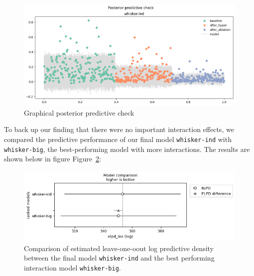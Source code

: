 \documentclass[
  letterpaper,
  DIV=11,
  numbers=noendperiod,
  oneside]{scrartcl}
\theoremstyle{plain}
\theoremstyle{remark}
\begin{document}
\begin{figure}

\begin{minipage}{\linewidth}

\includegraphics{../plots/whisker-posterior-check-ind.png}

\end{minipage}%

\caption{\label{fig-whisker-posterior-check}Graphical posterior
predictive check}

\end{figure}%

To back up our finding that there were no important interaction effects,
we compared the predictive performance of our final model
\texttt{whisker-ind} with \texttt{whisker-big}, the best-performing
model with more interactions. The results are shown below in figure
Figure~\ref{fig-whisker-loo-compare}:

\begin{figure}

\begin{minipage}{\linewidth}

\includegraphics{../plots/whisker-loo-compare.png}

\end{minipage}%

\caption{\label{fig-whisker-loo-compare}Comparison of estimated
leave-one-oout log predictive density between the final model
\texttt{whisker-ind} and the best performing interaction model
\texttt{whisker-big}.}

\end{figure}%
\end{document}
